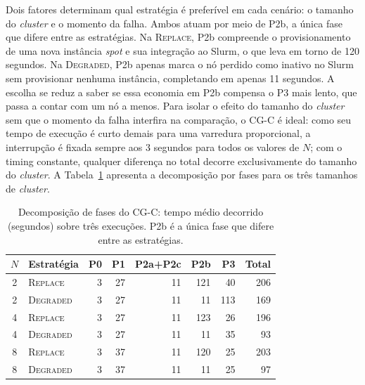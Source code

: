 \documentclass[a4paper,11pt]{article}
\begin{document}
            Dois fatores determinam qual estratégia é preferível em cada cenário: o
            tamanho do \textit{cluster} e o momento da falha. Ambos atuam por meio de
            P2b, a única fase que difere entre as estratégias. Na \textsc{Replace}, P2b
            compreende o provisionamento de uma nova instância \textit{spot} e sua
            integração ao Slurm, o que leva em torno de 120 segundos. Na
            \textsc{Degraded}, P2b apenas marca o nó perdido como inativo no Slurm sem
            provisionar nenhuma instância, completando em apenas 11 segundos. A escolha
            se reduz a saber se essa economia em P2b compensa o P3 mais lento, que passa
            a contar com um nó a menos. Para isolar o efeito do tamanho do
            \textit{cluster} sem que o momento da falha interfira na comparação, o CG-C
            é ideal: como seu tempo de execução é curto demais para uma varredura
            proporcional, a interrupção é fixada sempre aos 3 segundos para todos os
            valores de $N$; com o timing constante, qualquer diferença no total decorre
            exclusivamente do tamanho do \textit{cluster}. A Tabela~\ref{tab:cg-breakdown}
            apresenta a decomposição por fases para os três tamanhos de \textit{cluster}.

            \begin{table}[htb]
                \caption{Decomposição de fases do CG-C: tempo médio decorrido (segundos)
                         sobre três execuções. P2b é a única fase que difere entre
                         as estratégias.}
                \label{tab:cg-breakdown}
                \centering
                \small
                \begin{tabular}{clrrrrrr}
                    \toprule
                    \textbf{$N$} & \textbf{Estratégia} & \textbf{P0} & \textbf{P1} &
                    \textbf{P2a+P2c} & \textbf{P2b} & \textbf{P3} & \textbf{Total} \\
                    \midrule
                    2 & \textsc{Replace}  & 3 & 27 & 11 & 121 &  40 & 206 \\
                    2 & \textsc{Degraded} & 3 & 27 & 11 &  11 & 113 & 169 \\
                    \midrule
                    4 & \textsc{Replace}  & 3 & 27 & 11 & 123 &  26 & 196 \\
                    4 & \textsc{Degraded} & 3 & 27 & 11 &  11 &  35 &  93 \\
                    \midrule
                    8 & \textsc{Replace}  & 3 & 37 & 11 & 120 &  25 & 203 \\
                    8 & \textsc{Degraded} & 3 & 37 & 11 &  11 &  25 &  97 \\
                    \bottomrule
                \end{tabular}
            \end{table}
\end{document}
